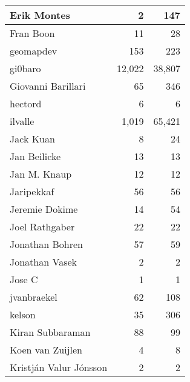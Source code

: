 \documentclass[a4paper,man,natbib,floatsintext]{apa6}
\begin{document}
\begin{table}[ht]
\begin{tabular}{|l|r|r|}
Erik Montes                    & 2               & 147           \\ \hline
Fran Boon                      & 11              & 28            \\ \hline
geomapdev                      & 153             & 223           \\ \hline
gi0baro                        & 12,022          & 38,807        \\ \hline
Giovanni Barillari             & 65              & 346           \\ \hline
hectord                        & 6               & 6             \\ \hline
ilvalle                        & 1,019           & 65,421        \\ \hline
Jack Kuan                      & 8               & 24            \\ \hline
Jan Beilicke                   & 13              & 13            \\ \hline
Jan M. Knaup                   & 12              & 12            \\ \hline
Jaripekkaf                     & 56              & 56            \\ \hline
Jeremie Dokime                 & 14              & 54            \\ \hline
Joel Rathgaber                 & 22              & 22            \\ \hline
Jonathan Bohren                & 57              & 59            \\ \hline
Jonathan Vasek                 & 2               & 2             \\ \hline
Jose C                         & 1               & 1             \\ \hline
jvanbraekel                    & 62              & 108           \\ \hline
kelson                         & 35              & 306           \\ \hline
Kiran Subbaraman               & 88              & 99            \\ \hline
Koen van Zuijlen               & 4               & 8             \\ \hline
Kristján Valur Jónsson         & 2               & 2             \\ \hline
\end{tabular}
\end{table}
\end{document}
